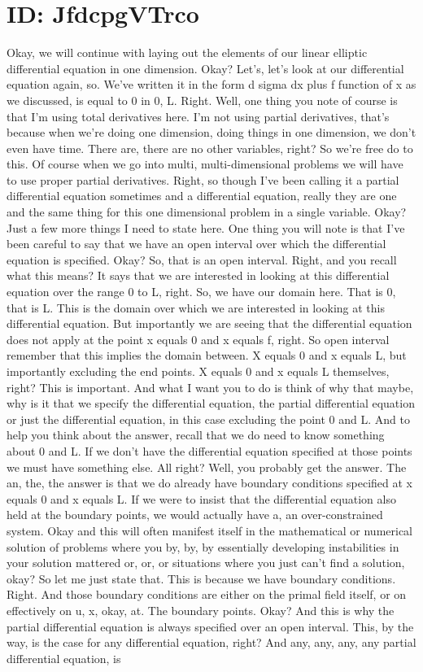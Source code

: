 \documentclass[10pt]{article}
\begin{document}
\section*{ID: JfdcpgVTrco}
Okay, we will continue with laying out the elements of our linear elliptic differential equation in one dimension. Okay? Let's, let's look at our differential equation again, so. We've written it in the form d sigma dx plus f function of x as we discussed, is equal to 0 in 0, L. Right. Well, one thing you note of course is that I'm using total derivatives here. I'm not using partial derivatives, that's because when we're doing one dimension, doing things in one dimension, we don't even have time. There are, there are no other variables, right? So we're free do to this. Of course when we go into multi, multi-dimensional problems we will have to use proper partial derivatives. Right, so though I've been calling it a partial differential equation sometimes and a differential equation, really they are one and the same thing for this one dimensional problem in a single variable. Okay? Just a few more things I need to state here. One thing you will note is that I've been careful to say that we have an open interval over which the differential equation is specified. Okay? So, that is an open interval. Right, and you recall what this means? It says that we are interested in looking at this differential equation over the range 0 to L, right. So, we have our domain here. That is 0, that is L. This is the domain over which we are interested in looking at this differential equation. But importantly we are seeing that the differential equation does not apply at the point x equals 0 and x equals f, right. So open interval remember that this implies the domain between. X equals 0 and x equals L, but importantly excluding the end points. X equals 0 and x equals L themselves, right? This is important. And what I want you to do is think of why that maybe, why is it that we specify the differential equation, the partial differential equation or just the differential equation, in this case excluding the point 0 and L. And to help you think about the answer, recall that we do need to know something about 0 and L. If we don't have the differential equation specified at those points we must have something else. All right? Well, you probably get the answer. The an, the, the answer is that we do already have boundary conditions specified at x equals 0 and x equals L. If we were to insist that the differential equation also held at the boundary points, we would actually have a, an over-constrained system. Okay and this will often manifest itself in the mathematical or numerical solution of problems where you by, by, by essentially developing instabilities in your solution mattered or, or, or situations where you just can't find a solution, okay? So let me just state that. This is because we have boundary conditions. Right. And those boundary conditions are either on the primal field itself, or on effectively on u, x, okay, at. The boundary points. Okay? And this is why the partial differential equation is always specified over an open interval. This, by the way, is the case for any differential equation, right? And any, any, any, any partial differential equation, is 
\end{document}

